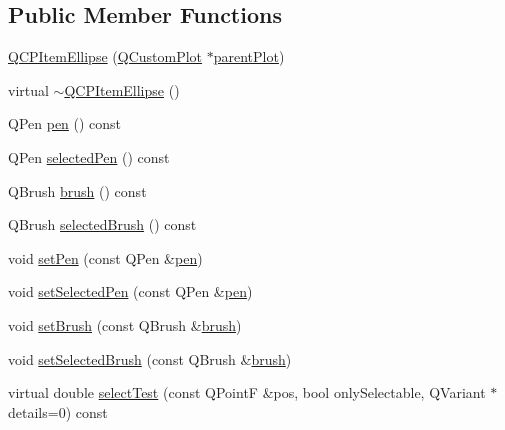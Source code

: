 \subsection*{Public Member Functions}
\begin{DoxyCompactItemize}
\item 
\hyperlink{classQCPItemEllipse_a759b77ef002515eba0263b5447ecb3fb}{Q\+C\+P\+Item\+Ellipse} (\hyperlink{classQCustomPlot}{Q\+Custom\+Plot} $\ast$\hyperlink{classQCPLayerable_ab7e0e94461566093d36ffc0f5312b109}{parent\+Plot})
\item 
virtual \hyperlink{classQCPItemEllipse_a3c17073a1805d32b4e09b6ccde0bef76}{$\sim$\+Q\+C\+P\+Item\+Ellipse} ()
\item 
Q\+Pen \hyperlink{classQCPItemEllipse_adb67471eabaf1214c99767f1653ca0ed}{pen} () const 
\item 
Q\+Pen \hyperlink{classQCPItemEllipse_ac52ab52225d238365ff3264b4b69130f}{selected\+Pen} () const 
\item 
Q\+Brush \hyperlink{classQCPItemEllipse_ac012e4fd59fdb1afb6554937bae8f7e1}{brush} () const 
\item 
Q\+Brush \hyperlink{classQCPItemEllipse_a0043e401a912d54ea3195bab0967b394}{selected\+Brush} () const 
\item 
void \hyperlink{classQCPItemEllipse_adb81a663ed2420fcfa011e49f678d1a6}{set\+Pen} (const Q\+Pen \&\hyperlink{classQCPItemEllipse_adb67471eabaf1214c99767f1653ca0ed}{pen})
\item 
void \hyperlink{classQCPItemEllipse_a6c542fba1dc918041c583f58a50dde99}{set\+Selected\+Pen} (const Q\+Pen \&\hyperlink{classQCPItemEllipse_adb67471eabaf1214c99767f1653ca0ed}{pen})
\item 
void \hyperlink{classQCPItemEllipse_a49fc74e6965834e873d027d026def798}{set\+Brush} (const Q\+Brush \&\hyperlink{classQCPItemEllipse_ac012e4fd59fdb1afb6554937bae8f7e1}{brush})
\item 
void \hyperlink{classQCPItemEllipse_a9693501cfaa43a099655c75bed0dab3f}{set\+Selected\+Brush} (const Q\+Brush \&\hyperlink{classQCPItemEllipse_ac012e4fd59fdb1afb6554937bae8f7e1}{brush})
\item 
virtual double \hyperlink{classQCPItemEllipse_acd7e5f9528630b2ab5987e2a5782eb7c}{select\+Test} (const Q\+PointF \&pos, bool only\+Selectable, Q\+Variant $\ast$details=0) const 
\end{DoxyCompactItemize}

